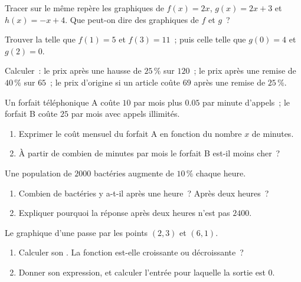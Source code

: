 \begin{exercise}[$\star$]\label{exo:g9:linfunc:4}
Tracer sur le même repère les graphiques de $f(x) = 2x$,
$g(x) = 2x + 3$ et $h(x) = -x + 4$. Que peut-on dire des graphiques de
$f$ et $g$~?
\end{exercise}

\begin{exercise}[$\star$]\label{exo:g9:linfunc:5}
Trouver la  telle que $f(1) = 5$ et $f(3) = 11$~; puis
celle telle que $g(0) = 4$ et $g(2) = 0$.
\end{exercise}

\begin{exercise}[$\star\star$]\label{exo:g9:linfunc:6}
Calculer~: le prix après une hausse de $25\,\%$ sur $120$~; le prix après
une remise de $40\,\%$ sur $65$~; le prix d'origine si un article coûte
$69$ après une remise de $25\,\%$.
\end{exercise}

\begin{exercise}[$\star\star$]\label{exo:g9:linfunc:7}
Un forfait téléphonique A coûte $10$ par mois plus $0.05$ par minute
d'appels~; le forfait B coûte $25$ par mois avec appels illimités.
\begin{enumerate}
  \item Exprimer le coût mensuel du forfait A en fonction du nombre $x$
        de minutes.
  \item À partir de combien de minutes par mois le forfait B est-il
        moins cher~?
\end{enumerate}
\end{exercise}

\begin{exercise}[$\star\star$]\label{exo:g9:linfunc:8}
Une population de $2000$ bactéries augmente de $10\,\%$ chaque heure.
\begin{enumerate}
  \item Combien de bactéries y a-t-il après une heure~? Après deux
        heures~?
  \item Expliquer pourquoi la réponse après deux heures n'est pas
        $2400$.
\end{enumerate}
\end{exercise}

\begin{exercise}[$\star\star$]\label{exo:g9:linfunc:9}
Le graphique d'une  passe par les points $(2, 3)$ et
$(6, 1)$.
\begin{enumerate}
  \item Calculer son . La fonction est-elle
        croissante ou décroissante~?
  \item Donner son expression, et calculer l'entrée pour laquelle la
        sortie est $0$.
\end{enumerate}
\end{exercise}

